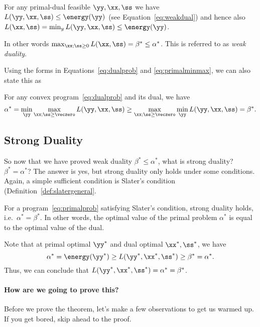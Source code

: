 For any primal-dual feasible $\yy,\xx,\ss$ we have
$L(\yy, \xx, \ss) \leq \energy(\yy)$ (see Equation~\eqref{eq:weakdual}) and hence also $L(\xx, \ss) = \min_y L(\yy, \xx, \ss) \leq \energy(\yy)$.

In other words $\max_{\xx; \ss \geq 0} L(\xx, \ss) = \beta^* \leq \alpha^*$.
This is referred to as \emph{weak duality}.

Using the forms in Equations~\eqref{eq:dualprob} and
\eqref{eq:primalminmax}, we can also state this as
\begin{theorem}
  For any convex program~\eqref{eq:dualprob} and its dual, we have
  \begin{equation*}
  \alpha^* = \min_{\yy}\max_{\xx; \ss\geq\veczero} L(\yy, \xx, \ss)
  \geq
  \max_{\xx; \ss\geq\veczero} \min_{\yy} L(\yy, \xx, \ss)
  =
  \beta^*
  .
\end{equation*}
\end{theorem}


\subsection{Strong Duality}
So now that we have proved weak duality $\beta^* \leq \alpha^*$,
what is strong duality? $\beta^* = \alpha^*$?
The answer is yes, but strong duality only holds under some conditions.
Again, a simple sufficient condition is Slater's condition (Definition~\ref{def:slatergeneral}.

\begin{theorem}
  \label{thm:slaterstrongduality}
For a program~\eqref{eq:primalprob} satisfying Slater's condition, strong duality holds, i.e.\ $\alpha^* = \beta^*$.
In other words, the optimal value of the primal problem $\alpha^*$ is
equal to the optimal value of the dual.
\end{theorem}

Note that at primal optimal $\yy^*$ and dual optimal $\xx^*,
\ss^*$, we have
\[
  \alpha^* = \energy(\yy^*) \geq L(\yy^*, \xx^*, \ss^*)
  \geq \beta^* = \alpha^*
  .
\]
Thus, we can conclude that $L(\yy^*, \xx^*, \ss^*) = \alpha^* = \beta^*$.




\paragraph{How are we going to prove this?} Before we prove the theorem, let's make a few observations to get us
warmed up. If you get bored, skip ahead to the proof.

